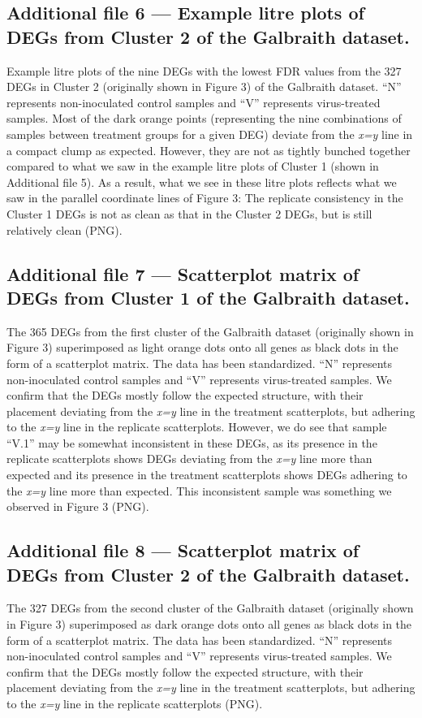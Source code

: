 \documentclass{bmcart}
\begin{document}
\begin{linenumbers}
\begin{backmatter}
  \subsection*{Additional file 6 --- Example litre plots of DEGs from Cluster 2 of the Galbraith dataset.}
    Example litre plots of the nine DEGs with the lowest FDR values from the 327 DEGs in Cluster 2 (originally shown in Figure 3) of the Galbraith dataset. ``N'' represents non-inoculated control samples and ``V'' represents virus-treated samples. Most of the dark orange points (representing the nine combinations of samples between treatment groups for a given DEG) deviate from the \textit{x=y} line in a compact clump as expected. However, they are not as tightly bunched together compared to what we saw in the example litre plots of Cluster 1 (shown in Additional file 5). As a result, what we see in these litre plots reflects what we saw in the parallel coordinate lines of Figure 3: The replicate consistency in the Cluster 1 DEGs is not as clean as that in the Cluster 2 DEGs, but is still relatively clean (PNG).

  \subsection*{Additional file 7 --- Scatterplot matrix of DEGs from Cluster 1 of the Galbraith dataset.}
    The 365 DEGs from the first cluster of the Galbraith dataset (originally shown in Figure 3) superimposed as light orange dots onto all genes as black dots in the form of a scatterplot matrix. The data has been standardized. ``N'' represents non-inoculated control samples and ``V'' represents virus-treated samples. We confirm that the DEGs mostly follow the expected structure, with their placement deviating from the \textit{x=y} line in the treatment scatterplots, but adhering to the \textit{x=y} line in the replicate scatterplots. However, we do see that sample ``V.1'' may be somewhat inconsistent in these DEGs, as its presence in the replicate scatterplots shows DEGs deviating from the \textit{x=y} line more than expected and its presence in the treatment scatterplots shows DEGs adhering to the \textit{x=y} line more than expected. This inconsistent sample was something we observed in Figure 3 (PNG).
    
  \subsection*{Additional file 8 --- Scatterplot matrix of DEGs from Cluster 2 of the Galbraith dataset.}
    The 327 DEGs from the second cluster of the Galbraith dataset (originally shown in Figure 3) superimposed as dark orange dots onto all genes as black dots in the form of a scatterplot matrix. The data has been standardized. ``N'' represents non-inoculated control samples and ``V'' represents virus-treated samples. We confirm that the DEGs mostly follow the expected structure, with their placement deviating from the \textit{x=y} line in the treatment scatterplots, but adhering to the \textit{x=y} line in the replicate scatterplots (PNG).
    

\end{backmatter}
\end{linenumbers}
\end{document}
